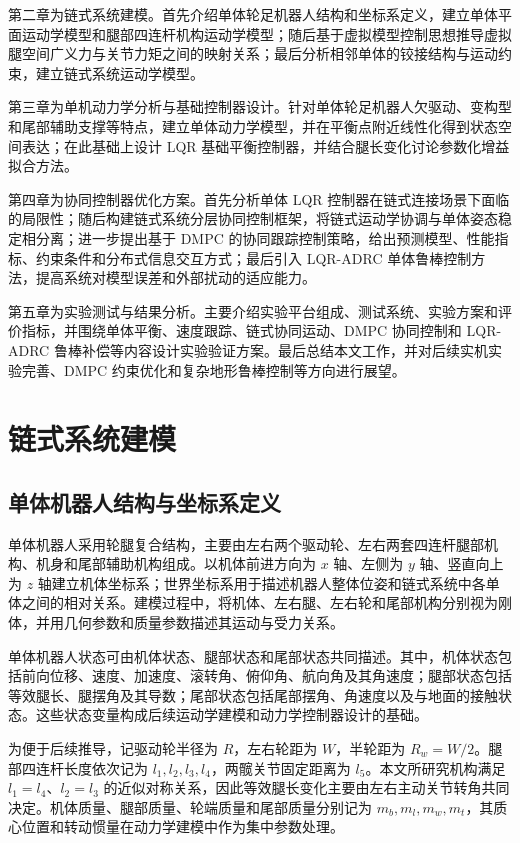 \documentclass[type=bachelor]{bithesis}
\begin{document}
第二章为链式系统建模。首先介绍单体轮足机器人结构和坐标系定义，建立单体平面运动学模型和腿部四连杆机构运动学模型；随后基于虚拟模型控制思想推导虚拟腿空间广义力与关节力矩之间的映射关系；最后分析相邻单体的铰接结构与运动约束，建立链式系统运动学模型。

第三章为单机动力学分析与基础控制器设计。针对单体轮足机器人欠驱动、变构型和尾部辅助支撑等特点，建立单体动力学模型，并在平衡点附近线性化得到状态空间表达；在此基础上设计 LQR 基础平衡控制器，并结合腿长变化讨论参数化增益拟合方法。

第四章为协同控制器优化方案。首先分析单体 LQR 控制器在链式连接场景下面临的局限性；随后构建链式系统分层协同控制框架，将链式运动学协调与单体姿态稳定相分离；进一步提出基于 DMPC 的协同跟踪控制策略，给出预测模型、性能指标、约束条件和分布式信息交互方式；最后引入 LQR-ADRC 单体鲁棒控制方法，提高系统对模型误差和外部扰动的适应能力。

第五章为实验测试与结果分析。主要介绍实验平台组成、测试系统、实验方案和评价指标，并围绕单体平衡、速度跟踪、链式协同运动、DMPC 协同控制和 LQR-ADRC 鲁棒补偿等内容设计实验验证方案。最后总结本文工作，并对后续实机实验完善、DMPC 约束优化和复杂地形鲁棒控制等方向进行展望。

\chapter{链式系统建模}

\section{单体机器人结构与坐标系定义}
单体机器人采用轮腿复合结构，主要由左右两个驱动轮、左右两套四连杆腿部机构、机身和尾部辅助机构组成。以机体前进方向为 $x$ 轴、左侧为 $y$ 轴、竖直向上为 $z$ 轴建立机体坐标系；世界坐标系用于描述机器人整体位姿和链式系统中各单体之间的相对关系。建模过程中，将机体、左右腿、左右轮和尾部机构分别视为刚体，并用几何参数和质量参数描述其运动与受力关系。

单体机器人状态可由机体状态、腿部状态和尾部状态共同描述。其中，机体状态包括前向位移、速度、加速度、滚转角、俯仰角、航向角及其角速度；腿部状态包括等效腿长、腿摆角及其导数；尾部状态包括尾部摆角、角速度以及与地面的接触状态。这些状态变量构成后续运动学建模和动力学控制器设计的基础。

为便于后续推导，记驱动轮半径为 $R$，左右轮距为 $W$，半轮距为 $R_w=W/2$。腿部四连杆长度依次记为 $l_1,l_2,l_3,l_4$，两髋关节固定距离为 $l_5$。本文所研究机构满足 $l_1=l_4$、$l_2=l_3$ 的近似对称关系，因此等效腿长变化主要由左右主动关节转角共同决定。机体质量、腿部质量、轮端质量和尾部质量分别记为 $m_b,m_l,m_w,m_t$，其质心位置和转动惯量在动力学建模中作为集中参数处理。
\end{document}
